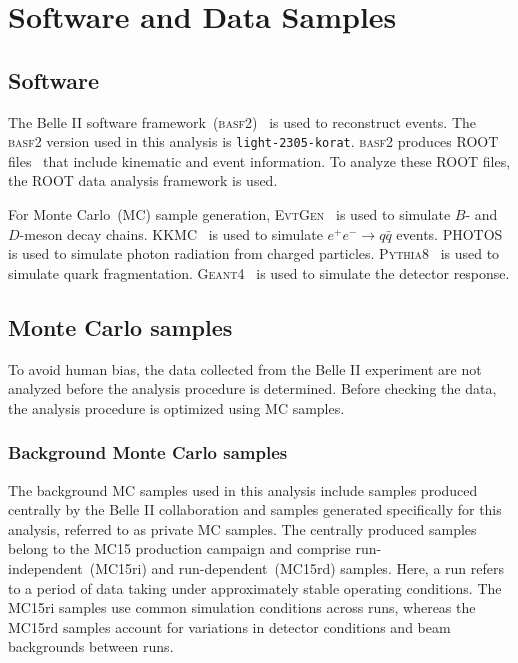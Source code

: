 \chapter{Software and Data Samples}

\section{Software}
The Belle II software framework~(\textsc{basf2})~\cite{Kuhr:2018lps} is used to reconstruct events.
The \textsc{basf2} version used in this analysis is \texttt{light-2305-korat}.
\textsc{basf2} produces ROOT files~\cite{Brun:1997pa} that include kinematic and event information.
To analyze these ROOT files, the ROOT data analysis framework is used.

For Monte Carlo~(MC) sample generation, \textsc{EvtGen}~\cite{Lange:2001uf} is used to simulate $B$- and $D$-meson decay chains.
\textsc{KKMC}~\cite{Jadach:1999vf} is used to simulate $e^{+}e^{-}\to q\bar{q}$ events. \textsc{PHOTOS}~\cite{Barberio:1990ms} is used to simulate photon radiation from charged particles.
\textsc{Pythia8}~\cite{Sjostrand:2014zea} is used to simulate quark fragmentation.
\textsc{Geant4}~\cite{Agostinelli:2002hh} is used to simulate the detector response.

\section{Monte Carlo samples}
To avoid human bias, the data collected from the Belle II experiment are not analyzed before the analysis procedure is determined.
Before checking the data, the analysis procedure is optimized using MC samples.

\subsection{Background Monte Carlo samples}
\label{sec:backgroundMC}
The background MC samples used in this analysis include samples produced centrally by the Belle II collaboration and samples generated specifically for this analysis, referred to as private MC samples.
The centrally produced samples belong to the MC15 production campaign and comprise run-independent~(MC15ri) and run-dependent~(MC15rd) samples.
Here, a run refers to a period of data taking under approximately stable operating conditions.
The MC15ri samples use common simulation conditions across runs, whereas the MC15rd samples account for variations in detector conditions and beam backgrounds between runs.


